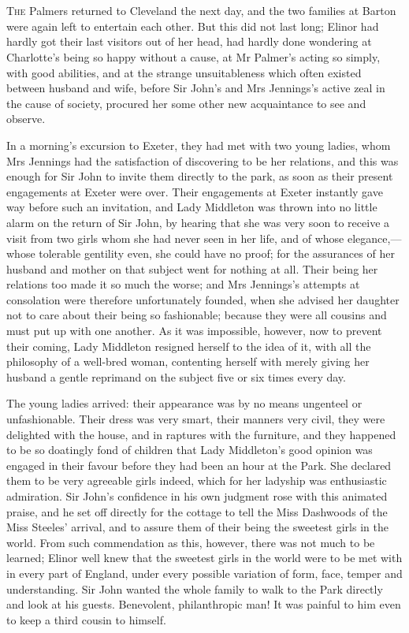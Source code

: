 \chapter[Chapter \thechapter]{}
\lettrine[lraise=0.3]{T}{he} Palmers returned to Cleveland the next day, and the two families at Barton were again left to entertain each other. But this did not last long; Elinor had hardly got their last visitors out of her head, had hardly done wondering at Charlotte's being so happy without a cause, at Mr Palmer's acting so simply, with good abilities, and at the strange unsuitableness which often existed between husband and wife, before Sir John's and Mrs Jennings's active zeal in the cause of society, procured her some other new acquaintance to see and observe.

In a morning's excursion to Exeter, they had met with two young ladies, whom Mrs Jennings had the satisfaction of discovering to be her relations, and this was enough for Sir John to invite them directly to the park, as soon as their present engagements at Exeter were over. Their engagements at Exeter instantly gave way before such an invitation, and Lady Middleton was thrown into no little alarm on the return of Sir John, by hearing that she was very soon to receive a visit from two girls whom she had never seen in her life, and of whose elegance,—whose tolerable gentility even, she could have no proof; for the assurances of her husband and mother on that subject went for nothing at all. Their being her relations too made it so much the worse; and Mrs Jennings's attempts at consolation were therefore unfortunately founded, when she advised her daughter not to care about their being so fashionable; because they were all cousins and must put up with one another. As it was impossible, however, now to prevent their coming, Lady Middleton resigned herself to the idea of it, with all the philosophy of a well-bred woman, contenting herself with merely giving her husband a gentle reprimand on the subject five or six times every day.

The young ladies arrived: their appearance was by no means ungenteel or unfashionable. Their dress was very smart, their manners very civil, they were delighted with the house, and in raptures with the furniture, and they happened to be so doatingly fond of children that Lady Middleton's good opinion was engaged in their favour before they had been an hour at the Park. She declared them to be very agreeable girls indeed, which for her ladyship was enthusiastic admiration. Sir John's confidence in his own judgment rose with this animated praise, and he set off directly for the cottage to tell the Miss Dashwoods of the Miss Steeles' arrival, and to assure them of their being the sweetest girls in the world. From such commendation as this, however, there was not much to be learned; Elinor well knew that the sweetest girls in the world were to be met with in every part of England, under every possible variation of form, face, temper and understanding. Sir John wanted the whole family to walk to the Park directly and look at his guests. Benevolent, philanthropic man! It was painful to him even to keep a third cousin to himself.

